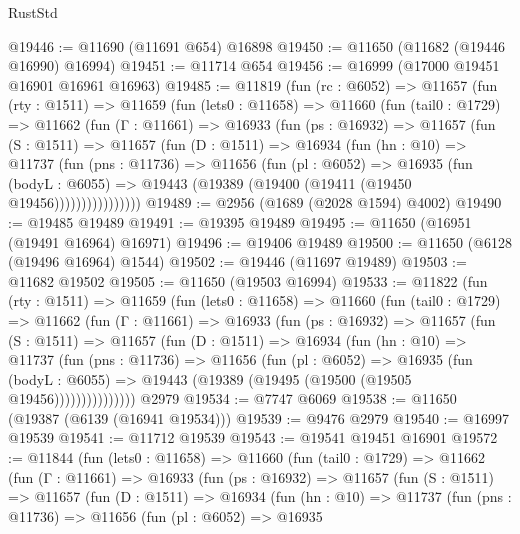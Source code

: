 \begin{lexlean}{RustStd}
\begin{coremodule}
@19446 := @11690 (@11691 @654) @16898
@19450 := @11650 (@11682 (@19446 @16990) @16994)
@19451 := @11714 @654
@19456 := @16999 (@17000 @19451 @16901 @16961 @16963)
@19485 := @11819
    (fun (rc : @6052) =>
    @11657
      (fun (rty : @1511) =>
      @11659
        (fun (lets0 : @11658) =>
        @11660
          (fun (tail0 : @1729) =>
          @11662
            (fun (Γ : @11661) =>
            @16933
              (fun (ps : @16932) =>
              @11657
                (fun (S : @1511) =>
                @11657
                  (fun (D : @1511) =>
                  @16934
                    (fun (hn : @10) =>
                    @11737
                      (fun (pns : @11736) =>
                      @11656
                        (fun (pl : @6052) =>
                        @16935
                          (fun (bodyL : @6055) =>
                          @19443 (@19389 (@19400 (@19411 (@19450 @19456))))))))))))))))
@19489 := @2956 (@1689 (@2028 @1594) @4002)
@19490 := @19485 @19489
@19491 := @19395 @19489
@19495 := @11650 (@16951 (@19491 @16964) @16971)
@19496 := @19406 @19489
@19500 := @11650 (@6128 (@19496 @16964) @1544)
@19502 := @19446 (@11697 @19489)
@19503 := @11682 @19502
@19505 := @11650 (@19503 @16994)
@19533 := @11822
    (fun (rty : @1511) =>
    @11659
      (fun (lets0 : @11658) =>
      @11660
        (fun (tail0 : @1729) =>
        @11662
          (fun (Γ : @11661) =>
          @16933
            (fun (ps : @16932) =>
            @11657
              (fun (S : @1511) =>
              @11657
                (fun (D : @1511) =>
                @16934
                  (fun (hn : @10) =>
                  @11737
                    (fun (pns : @11736) =>
                    @11656
                      (fun (pl : @6052) =>
                      @16935
                        (fun (bodyL : @6055) =>
                        @19443 (@19389 (@19495 (@19500 (@19505 @19456)))))))))))))))
    @2979
@19534 := @7747 @6069
@19538 := @11650 (@19387 (@6139 (@16941 @19534)))
@19539 := @9476 @2979
@19540 := @16997 @19539
@19541 := @11712 @19539
@19543 := @19541 @19451 @16901
@19572 := @11844
    (fun (lets0 : @11658) =>
    @11660
      (fun (tail0 : @1729) =>
      @11662
        (fun (Γ : @11661) =>
        @16933
          (fun (ps : @16932) =>
          @11657
            (fun (S : @1511) =>
            @11657
              (fun (D : @1511) =>
              @16934
                (fun (hn : @10) =>
                @11737
                  (fun (pns : @11736) =>
                  @11656
                    (fun (pl : @6052) =>
                    @16935

\end{coremodule}
\end{lexlean}
